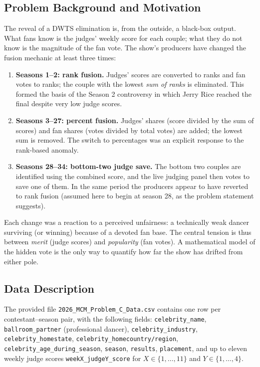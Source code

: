 \documentclass{article}
\begin{document}
\subsection{Problem Background and Motivation}

The reveal of a DWTS elimination is, from the outside, a black-box output. What fans know
is the judges' weekly score for each couple; what they do not know is the magnitude of the
fan vote. The show's producers have changed the fusion mechanic at least three times:

\begin{enumerate}
\item \textbf{Seasons 1--2: rank fusion.} Judges' scores are converted to ranks and fan
votes to ranks; the couple with the lowest \emph{sum of ranks} is eliminated. This formed
the basis of the Season 2 controversy in which Jerry Rice reached the final despite very
low judge scores.
\item \textbf{Seasons 3--27: percent fusion.} Judges' shares (score divided by the sum of
scores) and fan shares (votes divided by total votes) are added; the lowest sum is
removed. The switch to percentages was an explicit response to the rank-based anomaly.
\item \textbf{Seasons 28--34: bottom-two judge save.} The bottom two couples are identified
using the combined score, and the live judging panel then votes to save one of them. In
the same period the producers appear to have reverted to rank fusion (assumed here to begin
at season 28, as the problem statement suggests).
\end{enumerate}

Each change was a reaction to a perceived unfairness: a technically weak dancer surviving
(or winning) because of a devoted fan base. The central tension is thus between
\emph{merit} (judge scores) and \emph{popularity} (fan votes). A mathematical model of the
hidden vote is the only way to quantify how far the show has drifted from either pole.

\subsection{Data Description}

The provided file \texttt{2026\_MCM\_Problem\_C\_Data.csv} contains one row per
contestant--season pair, with the following fields: \texttt{celebrity\_name},
\texttt{ballroom\_partner} (professional dancer), \texttt{celebrity\_industry},
\texttt{celebrity\_homestate}, \texttt{celebrity\_homecountry/region},
\texttt{celebrity\_age\_during\_season}, \texttt{season}, \texttt{results},
\texttt{placement}, and up to eleven weekly judge scores \texttt{weekX\_judgeY\_score}
for $X\in\{1,\dots,11\}$ and $Y\in\{1,\dots,4\}$.
\end{document}
